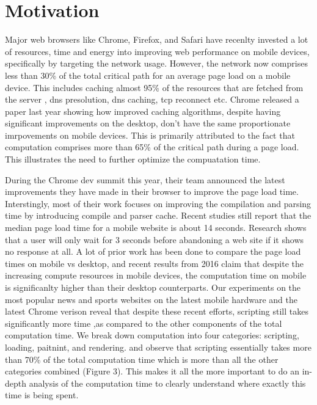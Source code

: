 \section{Motivation}
\label{sec:motivation}


Major web browsers like Chrome, Firefox, and Safari have recenlty invested a lot of resources,
time and energy into improving web performance on mobile devices, specifically by targeting 
the network usage. However, the network now comprises less than 30\% \cite{njait2016www} of the total critical
path for an average page load on a mobile device. This includes caching almost 95\% of the
resources that are fetched from the server \cite{vesuna2016caching}, dns presolution, dns caching, tcp reconnect etc.
Chrome released a paper last year showing how improved caching algorithms, despite having 
significant improvements on the desktop, don't have the same proportionate imrpovements 
on mobile devices. This is primarily attributed to the fact that computation comprises more than 65\%
of the critical path during a page load. This illustrates the need to further optimize the compuatation 
time. 

During the Chrome dev summit this year, their team announced the latest improvements they have 
made in their browser to improve the page load time. Interstingly, most of their work focuses on
improving the compilation and parsing time by introducing compile and parser cache. 
Recent studies \cite{url4} still report that the median page load time for a mobile website 
is about 14 seconds. Research \cite{url4} shows that a user will only wait for 3 seconds 
before abandoning a web site if it shows no response at all. A lot of prior work \cite {njait2016www}
has been done to compare the page load times on mobile vs desktop, and recent results
from 2016 claim that despite the increasing compute resources in mobile devices,
the computation time on mobile is significanlty higher than their desktop counterparts. 
 Our experiments
on the most popular news and sports websites on the latest mobile hardware and the latest 
Chrome verison reveal that despite these recent efforts, scripting still takes significantly more
time ,as compared to the other components of the total computation time. We break down computation
into four categories: scripting, loading, paitnint, and rendering.
and observe that scripting essentially takes more than 70\% of the total
computation time which is more than all the other categories combined (Figure 3). 
This makes it all the more important to do an in-depth analysis of the computation time to clearly
understand where exactly this time is being spent. 
